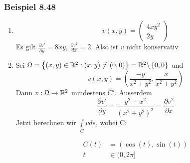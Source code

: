 \subsubsection*{Beispiel 8.48}
\begin{enumerate}
\item \[v\left( {x,y} \right) = \left( {\begin{array}{*{20}{c}}
{4x{y^2}}\\
{2y}
\end{array}} \right)\]
Es gilt $\frac{\partial v'}{\partial y}=8xy$, $\frac{\partial v^2}{dx}=2$. Also ist $v$ nicht konservativ
\item Sei $\Omega = \left\{ \left( x,y\right) \in\mathbb{R}^2:\left( x,y\right) \not= (0,0) \right\} = \mathbb{R}^2\backslash\left\{ 0,0\right\}$ und \[v(x,y) = \left( {\frac{{ - y}}{{{x^2} + {y^2}}},\frac{x}{{{x^2} + {y^2}}}} \right)\] Dann $v:\Omega \to\mathbb{R}^2$ mindestens $C'$. Ausserdem \[\frac{{\partial v'}}{{\partial y}} = \frac{{{y^2} - {x^2}}}{{{{\left( {{x^2} + {y^2}} \right)}^2}}} = \frac{{\partial {v^2}}}{{\partial x}}\] Jetzt berechnen wir $\int\limits_C v ds$, wobei C:

\begin{multicols}{2}
\begin{center}
\end{center}
\columnbreak
\null\vfill
\begin{align*}
C(t)&=\left( \cos(t),\sin(t)\right)\\
t&\in(0,2\pi]
\end{align*}
\null\vfill
\end{multicols}




\end{enumerate}
